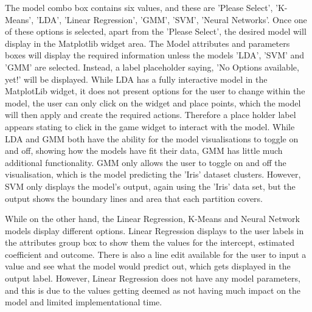 	The model combo box contains six values, and these are 'Please Select', 'K-Means', 'LDA', 'Linear Regression', 'GMM', 'SVM', 'Neural Networks'. Once one of these options is selected, apart from the 'Please Select', the desired model will display in the Matplotlib widget area. The Model attributes and parameters boxes will display the required information unless the models 'LDA', 'SVM' and 'GMM' are selected. Instead, a label placeholder saying, 'No Options available, yet!' will be displayed. While LDA has a fully interactive model in the MatplotLib widget, it does not present options for the user to change within the model, the user can only click on the widget and place points, which the model will then apply and create the required actions. Therefore a place holder label appears stating to click in the game widget to interact with the model. While LDA and GMM both have the ability for the model visualisations to toggle on and off, showing how the models have fit their data, GMM has little much additional functionality. GMM only allows the user to toggle on and off the visualisation, which is the model predicting the 'Iris' dataset clusters. However, SVM only displays the model's output, again using the 'Iris' data set, but the output shows the boundary lines and area that each partition covers.
	
	While on the other hand, the Linear Regression, K-Means and Neural Network models display different options. Linear Regression displays to the user labels in the attributes group box to show them the values for the intercept, estimated coefficient and outcome. There is also a line edit available for the user to input a value and see what the model would predict out, which gets displayed in the output label. However, Linear Regression does not have any model parameters, and this is due to the values getting deemed as not having much impact on the model and limited implementational time. 
	

